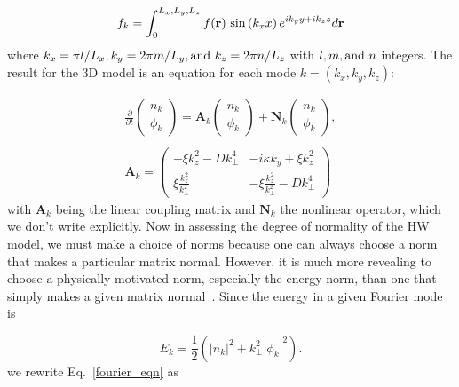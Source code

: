 \documentclass[twocolumn,showkeys,superscriptaddress]{revtex4}
\def\beq{\begin{equation}}
\def\eeq{\end{equation}}
\def\beqar{\begin{eqnarray}}
\def\eeqar{\end{eqnarray}}
\begin{document}
\beq
\label{fourier_form}
f_k = \int_0^{L_x,L_y,L_z} f(\mathbf{r}) \ {\rm sin} \left( k_x x \right) e^{i k_y y + i k_z z} d\mathbf{r}
\eeq
where $k_x = \pi l/L_x, k_y = 2 \pi m/L_y, {\rm and } \ k_z = 2 \pi n/L_z$ with $l, m, {\rm and } \ n$ integers.
The result for the 3D model is an equation for each mode $k = (k_x,k_y,k_z)$:

\beqar
\label{fourier_eqn}
\frac{\partial}{\partial t} \left( \begin{array}{cc} n_k \\ \phi_k \end{array} \right) = \mathbf{A}_k \left( \begin{array}{cc} n_k \\ \phi_k \end{array} \right) + \mathbf{N}_k \left( \begin{array}{cc} n_k \\ \phi_k \end{array} \right), \\ \nonumber \\
\label{A_k}
\mathbf{A}_k = \left( \begin{array}{cc} -\xi k_z^2 - D k_\perp^4 & -i \kappa k_y + \xi k_z^2 \\  \xi \frac{k_z^2}{k_\perp^2} & - \xi \frac{k_z^2}{k_\perp^2} - D k_\perp^4\end{array} \right)
\eeqar
with $\mathbf{A}_k$ being the linear coupling matrix and $\mathbf{N}_k$ the nonlinear operator, which we don't write explicitly.
Now in assessing the degree of normality of the HW model, we must make a choice of norms because one can always choose a norm that makes a particular matrix normal. However, it is much more revealing to choose
a physically motivated norm, especially the energy-norm, than one that simply makes a given matrix normal~\cite{camargo1998,schmid2007,camporeale2010}. Since the energy in a given Fourier mode is

\beq
\label{en_def}
E_k =  \frac{1}{2} \left( |n_k|^2 + k_\perp^2 |\phi_k|^2 \right).
\eeq
we rewrite Eq.~\ref{fourier_eqn} as
\end{document}
